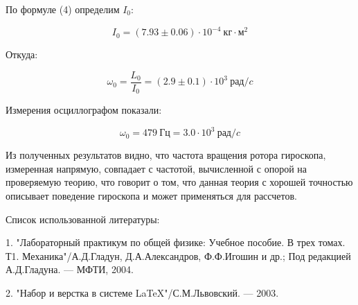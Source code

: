 \documentclass[14pt]{article}
\begin{document}
\vspace{0.5cm}
По формуле (4) определим $I_0$:

$$\boxed{I_0 = (7.93 \pm 0.06)\cdot 10^{-4}~\text{кг}\cdot\text{м}^2}$$

Откуда:

$$\omega_0 = \frac{L_0}{I_0} = (2.9 \pm 0.1)\cdot 10^{3}~\text{рад}/c$$

Измерения осциллографом показали:

$$\omega_0 = 479~\text{Гц} = 3.0 \cdot 10^{3}~\text{рад}/c$$

\vspace{1cm}

Из полученных результатов видно, что частота вращения ротора гироскопа, измеренная напрямую, совпадает с частотой, вычисленной с опорой на проверяемую теорию, что говорит о том, что данная теория с хорошей точностью описывает поведение гироскопа и может применяться для рассчетов.

\newpage
Список использованной литературы:
	
\vspace{0.5cm}
1. "Лабораторный практикум по общей физике: Учебное пособие. В трех томах. Т1. Механика"/А.Д.Гладун, Д.А.Александров,
Ф.Ф.Игошин и др.; Под редакцией А.Д.Гладуна. --- МФТИ, 2004.

2. "Набор и верстка в системе \LaTeX "/С.М.Львовский. --- 2003.
\end{document}
